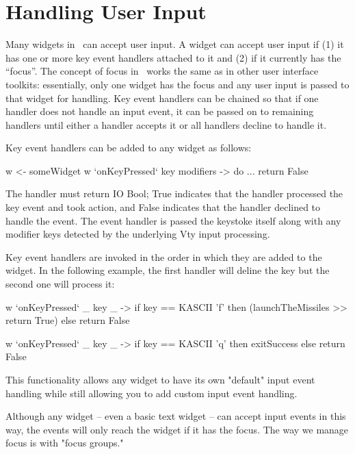 \section{Handling User Input}

Many widgets in \vtyui\ can accept user input.  A widget can accept
user input if (1) it has one or more key event handlers attached to it
and (2) if it currently has the ``focus''.  The concept of focus in
\vtyui\ works the same as in other user interface toolkits:
essentially, only one widget has the focus and any user input is
passed to that widget for handling.  Key event handlers can be chained
so that if one handler does not handle an input event, it can be
passed on to remaining handlers until either a handler accepts it or
all handlers decline to handle it.

Key event handlers can be added to any widget as follows:

\begin{haskellcode}
 w <- someWidget
 w `onKeyPressed` \this key modifiers -> do
   ...
   return False
\end{haskellcode}

The handler must return IO Bool; True indicates that the handler
processed the key event and took action, and False indicates that the
handler declined to handle the event.  The event handler is passed the
keystoke itself along with any modifier keys detected by the underlying
Vty input processing.

Key event handlers are invoked in the order in which they are added to
the widget.  In the following example, the first handler will deline the
 key but the second one will process it:

\begin{haskellcode}
 w `onKeyPressed` \_ key _ ->
   if key == KASCII 'f' then
     (launchTheMissiles >> return True) else
     return False

 w `onKeyPressed` \_ key _ ->
   if key == KASCII 'q' then
     exitSuccess else return False
\end{haskellcode}

This functionality allows any widget to have its own "default" input
event handling while still allowing you to add custom input event
handling.

Although any widget -- even a basic text widget -- can accept input
events in this way, the events will only reach the widget if it has the
focus.  The way we manage focus is with "focus groups."
